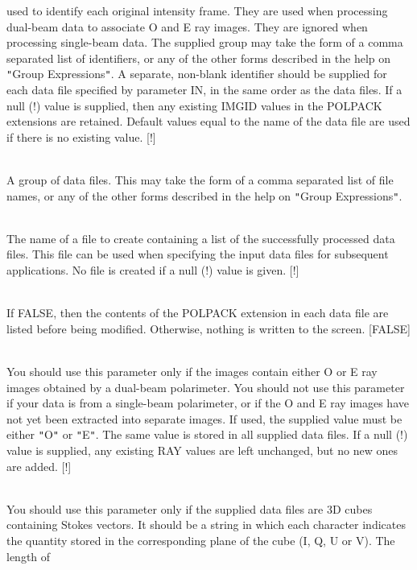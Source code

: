 \documentclass[twoside,11pt]{article}
\renewcommand{\_}{\texttt{\symbol{95}}}
\newcommand{\sstsubsection}[1]{ \item[{#1}] \mbox{} \\}
\newcommand{\sstsubsection}[1]{\item[{#1}]}
\begin{document}
{{{         used to identify each original intensity frame. They are used
         when processing dual-beam data to associate O and E ray images.
         They are ignored when processing single-beam data. The supplied
         group may take the form of a comma separated list of identifiers,
         or any of the other forms described in the help on {\tt "}Group
         Expressions{\tt "}. A separate, non-blank identifier should be
         supplied for each data file specified by parameter IN, in the
         same order as the data files. If a null (!) value is supplied,
         then any existing IMGID values in the POLPACK extensions are
         retained. Default values equal to the name of the data file are
         used if there is no existing value. [!]
      }
      \sstsubsection{
         IN = LITERAL (Read)
      }{
         A group of data files. This may take the form of a comma separated
         list of file names, or any of the other forms described in the help
         on {\tt "}Group Expressions{\tt "}.
      }
      \sstsubsection{
         NAMELIST = LITERAL (Read)
      }{
         The name of a file to create containing a list of the successfully
         processed data files. This file can be used when specifying the input
         data files for subsequent applications. No file is created if a null
         (!) value is given. [!]
      }
      \sstsubsection{
         QUIET = \_LOGICAL (Read)
      }{
         If FALSE, then the contents of the POLPACK extension in each data
         file are listed before being modified. Otherwise, nothing is written
         to the screen. [FALSE]
      }
      \sstsubsection{
         RAY = LITERAL (Read)
      }{
         You should use this parameter only if the images contain either O
         or E ray images obtained by a dual-beam polarimeter. You should
         not use this parameter if your data is from a single-beam
         polarimeter, or if the O and E ray images have not yet been
         extracted into separate images. If used, the supplied value must
         be either {\tt "}O{\tt "} or {\tt "}E{\tt "}. The same value is stored in all supplied
         data files. If a null (!) value is supplied, any existing RAY
         values are left unchanged, but no new ones are added. [!]
      }
      \sstsubsection{
         STOKES = LITERAL (Read)
      }{
         You should use this parameter only if the supplied data files
         are 3D cubes containing Stokes vectors. It should be a string in
         which each character indicates the quantity stored in the
         corresponding plane of the cube (I, Q, U or V). The length of
}}}
\end{document}
